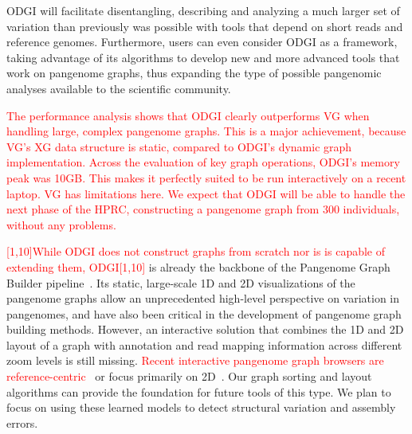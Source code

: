 \documentclass{bioinfo}
\newcommand{\REVIEWED}[1]{{\textcolor{Red}{#1}}}
\begin{document}
ODGI will facilitate disentangling,
describing and analyzing a much larger set of variation than previously was possible with tools that depend on short reads and reference genomes.
Furthermore, users can even consider ODGI as a framework, taking advantage of its algorithms to develop new and more advanced tools that work on pangenome graphs,
thus expanding the type of possible pangenomic analyses available to the scientific community.

\REVIEWED{The performance analysis shows that ODGI clearly outperforms VG when handling large, complex pangenome graphs. This is a major achievement, because VG's XG data structure is static, compared to ODGI's dynamic graph implementation. Across the evaluation of key graph operations, ODGI's memory peak was 10GB. This makes it perfectly suited to be run interactively on a recent laptop. VG has limitations here. We expect that ODGI will be able to handle the next phase of the HPRC, constructing a pangenome graph from 300 individuals, without any problems.}

\REVIEWED{[1,10]While ODGI does not construct graphs from scratch nor is is capable of extending them, ODGI[1,10]} is already the backbone of the Pangenome Graph Builder pipeline~\citep{pggb}.
Its static, large-scale 1D and 2D visualizations of the pangenome graphs allow an unprecedented high-level perspective on variation in pangenomes, and have also been critical in the development of pangenome graph building methods.  %
However, an interactive solution that combines the 1D and 2D layout of a graph with annotation and read mapping information across different zoom levels is still missing.
\REVIEWED{Recent interactive pangenome graph browsers are reference-centric}~\citep{Beyer2019, Yokoyama2019, Durant2021} or focus primarily on 2D~\citep{Wick_2015, Gonnella2018}.
Our graph sorting and layout algorithms can provide the foundation for future tools of this type.
We plan to focus on using these learned models to detect structural variation and assembly errors.
\end{document}
